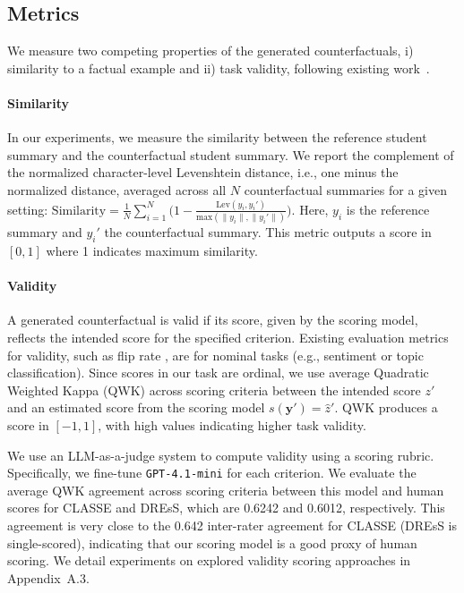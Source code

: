 \documentclass[letterpaper]{article} %
\begin{document}
\subsection{Metrics}
We measure two competing properties of the generated counterfactuals, i) similarity to a factual example and ii) task validity, following existing work~\cite{wang-etal-2024-survey}. 

\paragraph{Similarity}
In our experiments, we measure the similarity between the reference student summary and the counterfactual student summary. We report the complement of the normalized character-level Levenshtein distance, i.e., one minus the normalized distance, averaged across all $N$ counterfactual summaries for a given setting:
$\text{Similarity}=\frac{1}{N}\sum_{i=1}^N \big(1 -\frac{\text{Lev}(y_i, y_i')}{\text{max}(\lVert y_i \rVert, \lVert y_i' \rVert)}\big).$
Here, $y_i$ is the reference summary and $y_i'$ the counterfactual summary. This metric outputs a score in $[0,1]$ where 1 indicates maximum similarity.

\paragraph{Validity}
A generated counterfactual is valid if its score, given by the scoring model, reflects the intended score for the specified criterion. Existing evaluation metrics for validity, such as flip rate \cite{ross-etal-2021-explaining}, are for nominal tasks (e.g., sentiment or topic classification). Since scores in our task are ordinal, we use average Quadratic Weighted Kappa (QWK) across scoring criteria between the intended score $z'$ and an estimated score from the scoring model $s(\mathbf{y}')=\hat{z}'$. QWK produces a score in $[-1,1]$, with high values indicating higher task validity. 

We use an LLM-as-a-judge \cite{li_generation_2025} system to compute validity using a scoring rubric. Specifically, we fine-tune \texttt{GPT-4.1-mini} for each criterion. We evaluate the average QWK agreement across scoring criteria between this model and human scores for CLASSE and DREsS, which are 0.6242 and 0.6012, respectively. This agreement is very close to the 0.642 inter-rater agreement for CLASSE (DREsS is single-scored), indicating that our scoring model is a good proxy of human scoring. We detail experiments on explored validity scoring approaches in Appendix~A.3.
\end{document}
